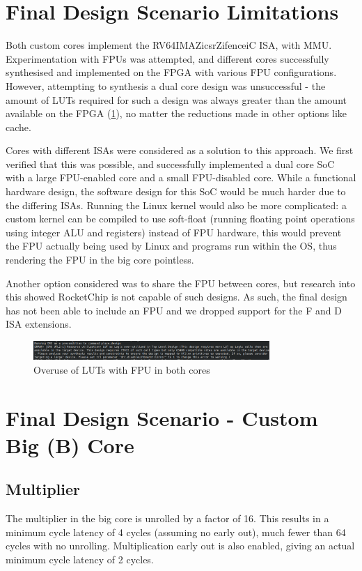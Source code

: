 \section{Final Design Scenario Limitations}
\label{sec:final_design}
Both custom cores implement the RV64IMAZicsrZifenceiC ISA, with MMU. Experimentation with FPUs was attempted, and different cores successfully synthesised and implemented on the FPGA with various FPU configurations. However, attempting to synthesis a dual core design was unsuccessful - the amount of LUTs required for such a design was always greater than the amount available on the FPGA (\ref{fig:fpu_lut}), no matter the reductions made in other options like cache.

Cores with different ISAs were considered as a solution to this approach. We first verified that this was possible, and successfully implemented a dual core SoC with a large FPU-enabled core and a small FPU-disabled core. While a functional hardware design, the software design for this SoC would be much harder due to the differing ISAs. Running the Linux kernel would also be more complicated: a custom kernel can be compiled to use soft-float (running floating point operations using integer ALU and registers) instead of FPU hardware, this would prevent the FPU actually being used by Linux and programs run within the OS, thus rendering the FPU in the big core pointless.

Another option considered was to share the FPU between cores, but research into this showed RocketChip is not capable of such designs. As such, the final design has not been able to include an FPU and we dropped support for the F and D ISA extensions.

\begin{figure}[h!]
    \centering
    \includegraphics[width=0.8\textwidth]{img/fpu_overuse.png}
    \caption{Overuse of LUTs with FPU in both cores}
    \label{fig:fpu_lut}
\end{figure}

\section{Final Design Scenario - Custom Big (B) Core}
\subsection{Multiplier}
The multiplier in the big core is unrolled by a factor of 16. This results in a minimum cycle latency of 4 cycles (assuming no early out), much fewer than 64 cycles with no unrolling. Multiplication early out is also enabled, giving an actual minimum cycle latency of 2 cycles.

